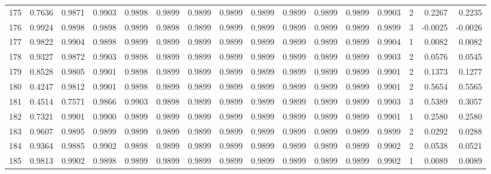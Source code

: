 \begin{tabular}{lrrrrrrrrrrrrrrr}
175 &      0.7636 &  0.9871 &  0.9903 &  0.9898 &  0.9899 &  0.9899 &  0.9899 &  0.9899 &  0.9899 &  0.9899 &   0.9899 &     0.9903 &      2 &                    0.2267 &                     0.2235 \\
176 &      0.9924 &  0.9898 &  0.9898 &  0.9899 &  0.9898 &  0.9899 &  0.9899 &  0.9899 &  0.9899 &  0.9899 &   0.9899 &     0.9899 &      3 &                   -0.0025 &                    -0.0026 \\
177 &      0.9822 &  0.9904 &  0.9898 &  0.9899 &  0.9899 &  0.9899 &  0.9899 &  0.9899 &  0.9899 &  0.9899 &   0.9899 &     0.9904 &      1 &                    0.0082 &                     0.0082 \\
178 &      0.9327 &  0.9872 &  0.9903 &  0.9898 &  0.9899 &  0.9899 &  0.9899 &  0.9899 &  0.9899 &  0.9899 &   0.9899 &     0.9903 &      2 &                    0.0576 &                     0.0545 \\
179 &      0.8528 &  0.9805 &  0.9901 &  0.9898 &  0.9899 &  0.9899 &  0.9899 &  0.9899 &  0.9899 &  0.9899 &   0.9899 &     0.9901 &      2 &                    0.1373 &                     0.1277 \\
180 &      0.4247 &  0.9812 &  0.9901 &  0.9898 &  0.9899 &  0.9899 &  0.9899 &  0.9899 &  0.9899 &  0.9899 &   0.9899 &     0.9901 &      2 &                    0.5654 &                     0.5565 \\
181 &      0.4514 &  0.7571 &  0.9866 &  0.9903 &  0.9898 &  0.9899 &  0.9899 &  0.9899 &  0.9899 &  0.9899 &   0.9899 &     0.9903 &      3 &                    0.5389 &                     0.3057 \\
182 &      0.7321 &  0.9901 &  0.9900 &  0.9899 &  0.9899 &  0.9899 &  0.9899 &  0.9899 &  0.9899 &  0.9899 &   0.9899 &     0.9901 &      1 &                    0.2580 &                     0.2580 \\
183 &      0.9607 &  0.9895 &  0.9899 &  0.9899 &  0.9899 &  0.9899 &  0.9899 &  0.9899 &  0.9899 &  0.9899 &   0.9899 &     0.9899 &      2 &                    0.0292 &                     0.0288 \\
184 &      0.9364 &  0.9885 &  0.9902 &  0.9898 &  0.9899 &  0.9899 &  0.9899 &  0.9899 &  0.9899 &  0.9899 &   0.9899 &     0.9902 &      2 &                    0.0538 &                     0.0521 \\
185 &      0.9813 &  0.9902 &  0.9898 &  0.9899 &  0.9899 &  0.9899 &  0.9899 &  0.9899 &  0.9899 &  0.9899 &   0.9899 &     0.9902 &      1 &                    0.0089 &                     0.0089 \\

\end{tabular}
